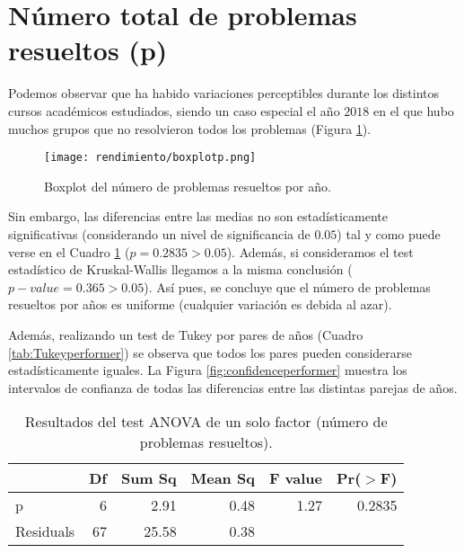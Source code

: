 \section{Número total de problemas resueltos (p)}

Podemos observar que ha habido variaciones perceptibles durante los distintos cursos académicos estudiados, siendo un caso especial el año $2018$ en el que hubo muchos grupos que no resolvieron todos los problemas (Figura \ref{fig:boxplotperformer}).

\begin{figure}[H]
    \centering
    \texttt{[image: rendimiento/boxplotp.png]}
    \caption{Boxplot del número de problemas resueltos por año.}
    \label{fig:boxplotperformer}
\end{figure}

Sin embargo, las diferencias entre las medias no son estadísticamente significativas (considerando un nivel de significancia de $0.05$) tal y como puede verse en el Cuadro \ref{tab:ANOVAperformer} ($p = 0.2835 > 0.05$). Además, si consideramos el test estadístico de Kruskal-Wallis llegamos a la misma conclusión ($p-value = 0.365 > 0.05$). Así pues, se concluye que el número de problemas resueltos por años es uniforme (cualquier variación es debida al azar).

Además, realizando un test de Tukey por pares de años (Cuadro \ref{tab:Tukeyperformer}) se observa que todos los pares pueden considerarse estadísticamente iguales. La Figura \ref{fig:confidenceperformer} muestra los intervalos de confianza de todas las diferencias entre las distintas parejas de años.

\begin{table}[H]
\centering
\caption{Resultados del test ANOVA de un solo factor (número de problemas resueltos).}
\label{tab:ANOVAperformer}
\begin{tabular}{lrrrrr}
  \hline
 & Df & Sum Sq & Mean Sq & F value & Pr($>$F) \\ 
  \hline
p & 6 & 2.91 & 0.48 & 1.27 & 0.2835 \\ 
  Residuals            & 67 & 25.58 & 0.38 &  &  \\ 
   \hline
\end{tabular}
\end{table}

